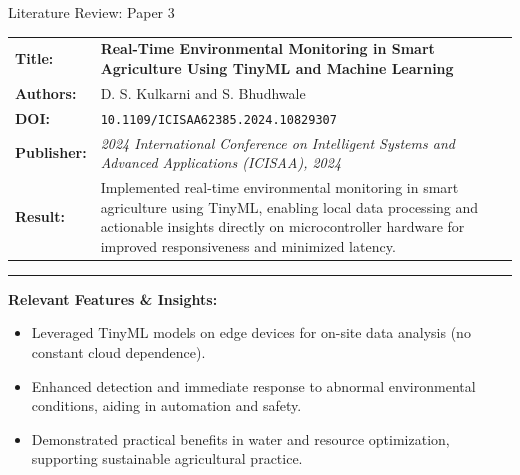 \documentclass{beamer}
\begin{document}
\begin{frame} {Literature Review: Paper 3}

    \begin{tabularx} {\textwidth} {
            >{\bfseries}m{2.0cm}X
        }

        Title: & \textbf{Real-Time Environmental Monitoring in Smart Agriculture Using TinyML and Machine Learning}
        \\

        Authors: & D. S. Kulkarni and S. Bhudhwale
        \\

        DOI: & \texttt{10.1109/ICISAA62385.2024.10829307}

        \\

        Publisher: & \textit{2024 International Conference on Intelligent Systems and Advanced Applications (ICISAA), 2024} \vfill
        \\

        Result: &
        Implemented real-time environmental monitoring in smart agriculture using TinyML, enabling local data
        processing and actionable insights directly on microcontroller hardware for improved responsiveness and minimized latency.

        \\

    \end{tabularx}

    {\color{leafColorSecondary} \rule{\textwidth}{0.75pt}}

    \textbf{Relevant Features \& Insights:}

    \begin{itemize}

        \item Leveraged TinyML models on edge devices for on-site data analysis (no constant cloud dependence).

        \item Enhanced detection and immediate response to abnormal environmental conditions, aiding in automation and safety.

        \item Demonstrated practical benefits in water and resource optimization, supporting sustainable agricultural practice.

    \end{itemize}

\end{frame}
\end{document}

